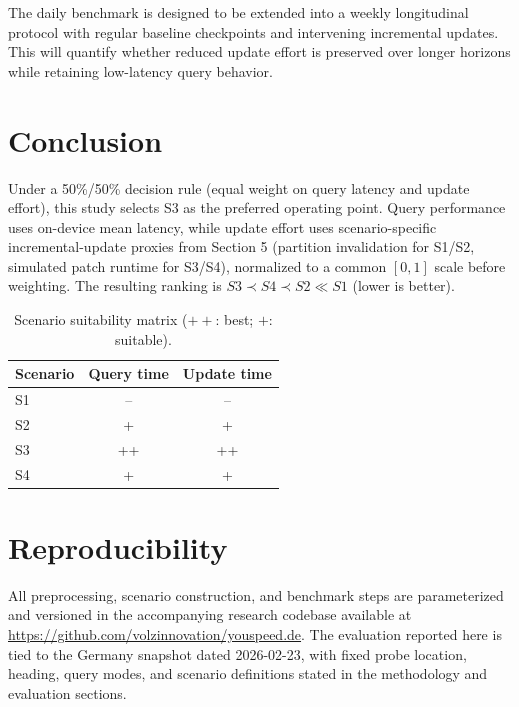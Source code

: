 \documentclass{article}
\begin{document}
The daily benchmark is designed to be extended into a weekly longitudinal protocol with regular baseline checkpoints and intervening incremental updates. This will quantify whether reduced update effort is preserved over longer horizons while retaining low-latency query behavior.

\section{Conclusion}
Under a 50\%/50\% decision rule (equal weight on query latency and update effort), this study selects S3 as the preferred operating point. Query performance uses on-device mean latency, while update effort uses scenario-specific incremental-update proxies from Section 5 (partition invalidation for S1/S2, simulated patch runtime for S3/S4), normalized to a common \([0,1]\) scale before weighting. The resulting ranking is \(S3 \prec S4 \prec S2 \ll S1\) (lower is better).

\begin{table}[!htbp]
\centering
\caption{Scenario suitability matrix (\(++\): best; \(+\): suitable).}
\label{tab:scenario_matrix}
\begin{tabular}{lcc}
\toprule
Scenario & Query time & Update time \\
\midrule
S1 & -- & -- \\
S2 & + & + \\
S3 & ++ & ++ \\
S4 & + & + \\
\bottomrule
\end{tabular}
\end{table}

\section*{Reproducibility}
All preprocessing, scenario construction, and benchmark steps are parameterized and versioned in the accompanying research codebase available at \url{https://github.com/volzinnovation/youspeed.de}. The evaluation reported here is tied to the Germany snapshot dated 2026-02-23, with fixed probe location, heading, query modes, and scenario definitions stated in the methodology and evaluation sections. 



\end{document}
